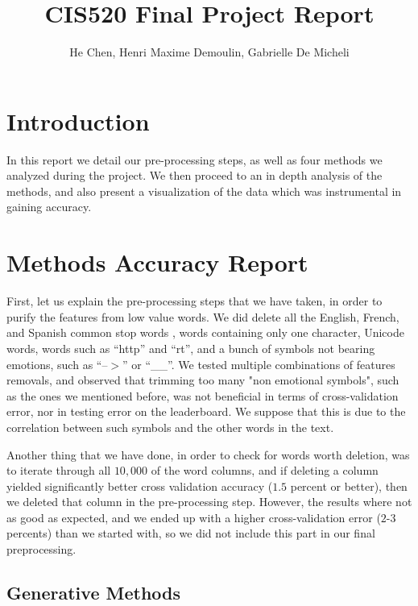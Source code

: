 \documentclass[11pt,twocolumn]{report}
\author{He Chen, Henri Maxime Demoulin, Gabrielle De Micheli}
\title{CIS520 Final Project Report}
\begin{document}
\maketitle
\section*{Introduction}
    In this report we detail our pre-processing steps, as well as four methods we analyzed during the project. We then proceed to an in depth analysis of the methods, and also present a visualization of the data which was instrumental in gaining accuracy.

\section*{Methods Accuracy Report}
    First, let us explain the pre-processing steps that we have taken, in order to purify the features from low value words. We did delete all the English, French, and Spanish common stop words \cite{stopwords}, words containing only one character, Unicode words, words such as ``http'' and ``rt'', and a bunch of symbols not bearing emotions, such as ``--$>$'' or ``\_\_''. We tested multiple combinations of features removals, and observed that trimming too many "non emotional symbols", such as the ones we mentioned before, was not beneficial in terms of cross-validation error, nor in testing error on the leaderboard. We suppose that this is due to the correlation between such symbols and the other words in the text.
    \par
	Another thing that we have done, in order to check for words worth deletion, was to iterate through all $10,000$ of the word columns, and if deleting a column yielded significantly better cross validation accuracy ($1.5$ percent or better), then we deleted that column in the pre-processing step. However, the results where not as good as expected, and we ended up with a higher cross-validation error ($2$-$3$ percents) than we started with, so we did not include this part in our final preprocessing. 
    
    \subsection*{Generative Methods}
\end{document}
